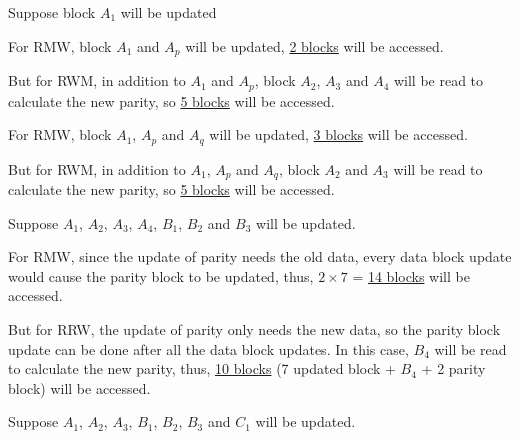 \documentclass[11pt]{homework}
\begin{document}
\setlength{\intextsep}{0em}
\setlength{\belowdisplayskip}{.25em} \setlength{\belowdisplayshortskip}{.25em}
\setlength{\abovedisplayskip}{.25em} \setlength{\abovedisplayshortskip}{.25em}
\maketitle
\question
\begin{alphaparts}
    \questionpart Suppose block $A_1$ will be updated
    \begin{description}[
            leftmargin = !,
            labelwidth = \widthof{\bfseries RAID-5},
            topsep = 0pt,
            itemsep = 0pt,
            parsep = 0pt
        ]
        \item[RAID-5] For RMW, block $A_1$ and $A_p$ will be updated, \underline{2 blocks} will be
            accessed.

            But for RWM, in addition to $A_1$ and $A_p$, block $A_2$, $A_3$ and $A_4$ will
            be read to calculate the new parity, so \underline{5 blocks} will be accessed.
        \item[RAID-6] For RMW, block $A_1$, $A_p$ and $A_q$ will be updated, \underline{3 blocks}
            will be accessed.

            But for RWM, in addition to $A_1$, $A_p$ and $A_q$, block $A_2$ and $A_3$ will
            be read to calculate the new parity, so \underline{5 blocks} will be accessed.
    \end{description}
    \questionpart \hfill
    \begin{description}[
            leftmargin = !,
            labelwidth = \widthof{\bfseries RAID-5},
            topsep = 0pt,
            itemsep = 0pt,
            parsep = 0pt
        ]
        \item[RAID-5] Suppose $A_1$, $A_2$, $A_3$, $A_4$, $B_1$, $B_2$ and $B_3$ will be updated.

            For RMW, since the update of parity needs the old data, every data block update would
            cause the parity block to be updated, thus, $2\times 7$ = \underline{14 blocks} will be
            accessed.

            But for RRW, the update of parity only needs the new data, so the parity block update
            can be done after all the data block updates. In this case, $B_4$ will be read to
            calculate the new parity, thus, \underline{10 blocks} (7 updated block + $B_4$ + 2
            parity block) will be accessed.
        \item[RAID-6] Suppose $A_1$, $A_2$, $A_3$, $B_1$, $B_2$, $B_3$ and $C_1$ will be updated.


\end{description}
\end{alphaparts}
\end{document}
